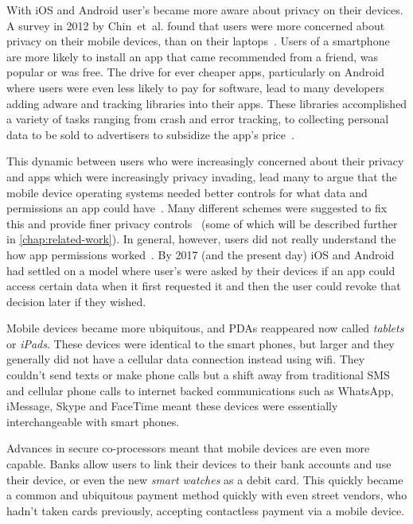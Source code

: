 \documentclass[thesis.tex]{subfiles}
\begin{document}
With iOS and Android user's became more aware about privacy on their
devices.  A survey in 2012 by Chin~et~al{.} found that users were more
concerned about privacy on their mobile devices, than on their
laptops~\cite{chin_measuring_2012}. Users of a smartphone are more
likely to install an app that came recommended from a friend, was
popular or was free.  The drive for ever cheaper apps, particularly on
Android where users were even less likely to pay for software, lead to
many developers adding adware and tracking libraries into their apps.
These libraries accomplished a variety of tasks ranging from crash and
error tracking, to collecting personal data to be sold to advertisers
to subsidize the app's price~\cite{seungyeop_han_study_2012}.

This dynamic between users who were increasingly concerned about their
privacy and apps which were increasingly privacy invading, lead many
to argue that the mobile device operating systems needed better
controls for what data and permissions an app could
have~\cite{leontiadis_dont_2012}.  Many different schemes were
suggested to fix this and provide finer privacy
controls~\cite{jeon_dr._2012,beresford_mockdroid:_2011,conti_crepe:_2010,backes_appguard_2013}
(some of which will be described further in
\autoref{chap:related-work}).  In general, however, users did not
really understand the how app permissions
worked~\cite{felt_android_2012}.  By 2017 (and the present day) iOS
and Android had settled on a model where user's were asked by their
devices if an app could access certain data when it first requested it
and then the user could revoke that decision later if they wished.

Mobile devices became more ubiquitous, and \acp{PDA} reappeared now
called \emph{tablets} or \emph{iPads}.  These devices were identical
to the smart phones, but larger and they generally did not have a
cellular data connection instead using wifi. They couldn't send
texts or make phone calls but a shift away from traditional SMS and
cellular phone calls to internet backed communications such as
WhatsApp, iMessage, Skype and FaceTime meant these devices were
essentially interchangeable with smart phones.

Advances in secure co-processors meant that mobile devices are even
more capable.  Banks allow users to link their devices to
their bank accounts and use their device, or even the new \emph{smart
  watches} as a debit card.  This quickly became a common and ubiquitous
payment method quickly with even street vendors, who hadn't taken
cards previously, accepting contactless payment via a mobile device.
\end{document}
